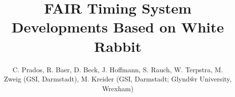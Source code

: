 \documentclass{JAC2003}
\begin{document}
\title{FAIR Timing System Developments Based on White Rabbit}

\author{C. Prados, R. Baer, D. Beck, J. Hoffmann, S. Rauch, W. Terpstra, M. \\
Zweig (GSI, Darmstadt), M. Kreider (GSI, Darmstadt; Glyndŵr University, \\
Wrexham)}
\maketitle








\end{document}
